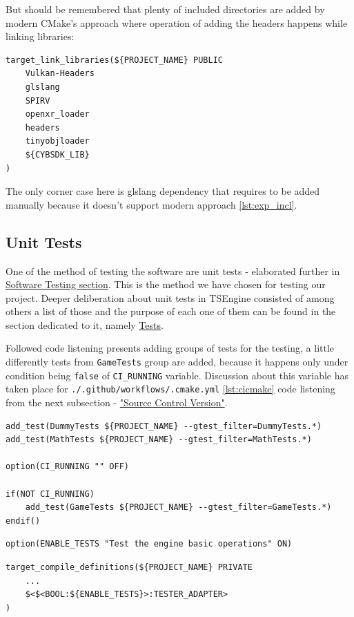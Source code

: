 But should be remembered that plenty of included directories are added by modern CMake's approach where operation of adding the headers happens while linking libraries: 
\begin{lstlisting}[caption=Implicitly added directories (./engine/CMakeLists.txt)]
target_link_libraries(${PROJECT_NAME} PUBLIC
    Vulkan-Headers
    glslang
    SPIRV
    openxr_loader
    headers
    tinyobjloader
    ${CYBSDK_LIB}
)
\end{lstlisting}
The only corner case here is glslang dependency that requires to be added manually because it doesn't support modern approach \ref{lst:exp_incl}.

\subsection{Unit Tests}
\label{sec:build_unit_tests}
One of the method of testing the software are unit tests - elaborated further in \hyperref[sec:testing]{Software Testing section}. This is the method we have chosen for testing our project.
Deeper deliberation about unit tests in TSEngine consisted of among others a list of those and the purpose of each one of them can be found in the section dedicated to it, namely \hyperref[sec:tests]{Tests}.

Followed code listening presents adding groups of tests for the testing, a little differently tests from \texttt{GameTests} group are added, because it happens only under condition being \texttt{false} of \texttt{CI\_RUNNING} variable.
Discussion about this variable has taken place for \texttt{./.github/workflows/.cmake.yml} \ref{lst:cicmake} code listening from the next subsection - \hyperref[sec:scv]{"Source Control Version"}.
\begin{lstlisting}[caption=Adding tests to CTest (./engine/CMakeLists.txt)]
add_test(DummyTests ${PROJECT_NAME} --gtest_filter=DummyTests.*)
add_test(MathTests ${PROJECT_NAME} --gtest_filter=MathTests.*)

option(CI_RUNNING "" OFF)

if(NOT CI_RUNNING)
    add_test(GameTests ${PROJECT_NAME} --gtest_filter=GameTests.*)
endif()
\end{lstlisting}

\begin{lstlisting}[caption=Enabling Tests(./CMakeLists.txt)]
option(ENABLE_TESTS "Test the engine basic operations" ON)
\end{lstlisting}

\begin{lstlisting}[caption=\texttt{TESTER\_ADAPTER} preprocessor declaration(./engine/CMakeLists.txt and ./engine/tests/CMakeLists.txt)]
target_compile_definitions(${PROJECT_NAME} PRIVATE
    ...
    $<$<BOOL:${ENABLE_TESTS}>:TESTER_ADAPTER>
)
\end{lstlisting}

